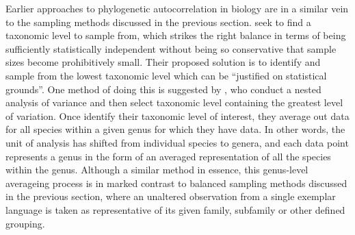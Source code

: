 Earlier approaches to phylogenetic autocorrelation in biology are in a similar vein to the sampling methods discussed in the previous section. \textcite[pp.~346--347]{harvey_comparisons_1982} seek to find a taxonomic level to sample from, which strikes the right balance in terms of being sufficiently statistically independent without being so conservative that sample sizes become prohibitively small. Their proposed solution is to identify and sample from the lowest taxonomic level which can be ``justified on statistical grounds''. One method of doing this is suggested by \textcite[pp.~6--8]{clutton-brock_primate_1977}, who conduct a nested analysis of variance and then select taxonomic level containing the greatest level of variation. Once \textcite{clutton-brock_primate_1977} identify their taxonomic level of interest, they average out data for all species within a given genus for which they have data. In other words, the unit of analysis has shifted from individual species to genera, and each data point represents a genus in the form of an averaged representation of all the species within the genus. Although a similar method in essence, this genus-level averageing process is in marked contrast to balanced sampling methods discussed in the previous section, where an unaltered observation from a single exemplar language is taken as representative of its given family, subfamily or other defined grouping.

